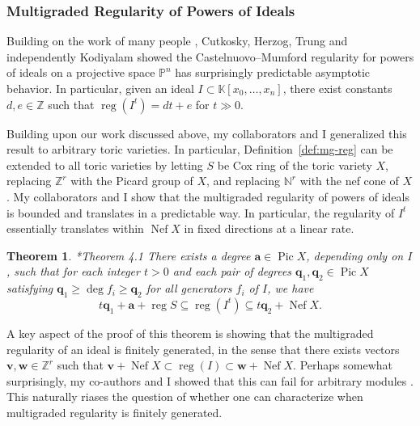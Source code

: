 \documentclass[11pt,reqno]{amsart}
\newtheorem{theorem}[lemma]{Theorem}
\theoremstyle{remark}
\newcommand{\reg}{\operatorname{reg}}
\newcommand{\Pic}{\operatorname{Pic}}
\newcommand{\Nef}{\operatorname{Nef}}
\renewcommand{\aa}{\mathbf a}
\newcommand{\vv}{\mathbf v}
\newcommand{\ww}{\mathbf w}
\newcommand{\qq}{\mathbf q}
\newcommand{\K}{\mathbb{K}}
\newcommand{\N}{\mathbb{N}}
\renewcommand{\P}{\mathbb{P}}
\newcommand{\Z}{\mathbb{Z}}
\newcommand{\juliette}[1]{{\color{red} \sf $\spadesuit\spadesuit\spadesuit$ Juliette: [#1]}}
\begin{document}
\subsubsection{Multigraded Regularity of Powers of Ideals}

Building on the work of many people \cite{bertramEinLazarsfeld91,chandler97}, Cutkosky, Herzog, Trung \cite{cutkoskyHerzogTrung99} and independently Kodiyalam \cite{kodiyalam00} showed the Castelnuovo--Mumford regularity for powers of ideals on a projective space $\P^n$ has surprisingly predictable asymptotic behavior. In particular, given an ideal $I\subset \K[x_0,\ldots,x_n]$, there exist constants $d,e\in\Z$ such that $\reg\!\left(I^t\right) = dt+e$ for $t\gg0$.

Building upon our work discussed above, my collaborators and I generalized this result to arbitrary toric varieties. In particular, Definition~\ref{def:mg-reg} can be extended to all toric varieties by letting $S$ be Cox ring of the toric variety $X$, replacing $\Z^r$ with the Picard group of $X$, and replacing $\N^{r}$ with the nef cone of $X$. My collaborators and I show that the multigraded regularity of powers of ideals is bounded and translates in a predictable way. In particular, the regularity of $I^{t}$ essentially translates within $\Nef X$ in fixed directions at a linear rate.


 

\begin{theorem}\cite{bruceHellerSayrafi22}*{Theorem 4.1}
  There exists a degree $\aa\in\Pic X$, depending only on $I$, such that for each integer $t>0$ and each pair of degrees $\qq_1,\qq_2\in\Pic X$ satisfying $\qq_1\geq\deg f_i\geq\qq_2$ for all generators $f_i$ of $I$, we have
	\[ t\qq_1+\aa+\reg S \subseteq \reg\!\left(I^t\right) \subseteq t\qq_2+\Nef X. \]
\end{theorem}

A key aspect of the proof of this theorem is showing that the multigraded regularity of an ideal is finitely generated, in the sense that there exists vectors $\vv,\ww\in \Z^r$ such that $\vv+\Nef X \subset \reg(I) \subset \ww + \Nef X$. Perhaps somewhat surprisingly, my co-authors and I showed that this can fail for arbitrary modules \cite{bruceHellerSayrafi22}. This naturally riases the question of whether one can characterize when multigraded regularity is finitely generated. 
\end{document}
